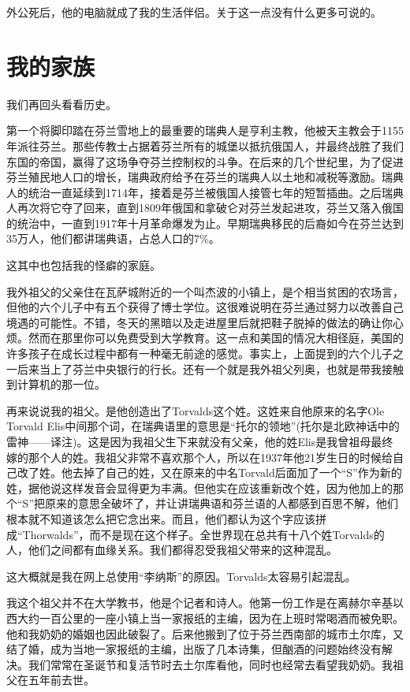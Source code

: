 外公死后，他的电脑就成了我的生活伴侣。关于这一点没有什么更多可说的。

 
\section{我的家族}

我们再回头看看历史。

第一个将脚印踏在芬兰雪地上的最重要的瑞典人是亨利主教，他被天主教会于1155年派往芬兰。那些传教士占据着芬兰所有的城堡以抵抗俄国人，并最终战胜了我们东国的帝国，赢得了这场争夺芬兰控制权的斗争。在后来的几个世纪里，为了促进芬兰殖民地人口的增长，瑞典政府给予在芬兰的瑞典人以土地和减税等激励。瑞典人的统治一直延续到1714年，接着是芬兰被俄国人接管七年的短暂插曲。之后瑞典人再次将它夺了回来，直到1809年俄国和拿破仑对芬兰发起进攻，芬兰又落入俄国的统治中，一直到1917年十月革命爆发为止。早期瑞典移民的后裔如今在芬兰达到35万人，他们都讲瑞典语，占总人口的7\%。

这其中也包括我的怪癖的家庭。

我外祖父的父亲住在瓦萨城附近的一个叫杰波的小镇上，是个相当贫困的农场言，但他的六个儿子中有五个获得了博士学位。这很难说明在芬兰通过努力以改善自己境遇的可能性。不错，冬天的黑暗以及走进屋里后就把鞋子脱掉的做法的确让你心烦。然而在那里你可以免费受到大学教育。这一点和美国的情况大相径庭，美国的许多孩子在成长过程中都有一种毫无前途的感觉。事实上，上面提到的六个儿子之一后来当上了芬兰中央银行的行长。还有一个就是我外祖父列奥，也就是带我接触到计算机的那一位。

再来说说我的祖父。是他创造出了Torvalds这个姓。这姓来自他原来的名字Ole Torvald Elis中间那个词，在瑞典语里的意思是“托尔的领地”(托尔是北欧神话中的雷神——译注)。这是因为我祖父生下来就没有父亲，他的姓Elis是我曾祖母最终嫁的那个人的姓。我祖父非常不喜欢那个人，所以在1937年他21岁生日的时候给自己改了姓。他去掉了自己的姓，又在原来的中名Torvald后面加了一个“S”作为新的姓，据他说这样发音会显得更为丰满。但他实在应该重新改个姓，因为他加上的那个“S”把原来的意思全破坏了，并让讲瑞典语和芬兰语的人都感到百思不解，他们根本就不知道该怎么把它念出来。而且，他们都认为这个字应该拼成“Thorwalds”，而不是现在这个样子。全世界现在总共有十八个姓Torvalds的人，他们之间都有血缘关系。我们都得忍受我祖父带来的这种混乱。

这大概就是我在网上总使用“李纳斯”的原因。Torvalds太容易引起混乱。

我这个祖父并不在大学教书，他是个记者和诗人。他第一份工作是在离赫尔辛基以西大约一百公里的一座小镇上当一家报纸的主编，因为在上班时常喝酒而被免职。他和我奶奶的婚姻也因此破裂了。后来他搬到了位于芬兰西南部的城市土尔库，又结了婚，成为当地一家报纸的主编，出版了几本诗集，但酗酒的问题始终没有解决。我们常常在圣诞节和复活节时去土尔库看他，同时也经常去看望我奶奶。我祖父在五年前去世。

